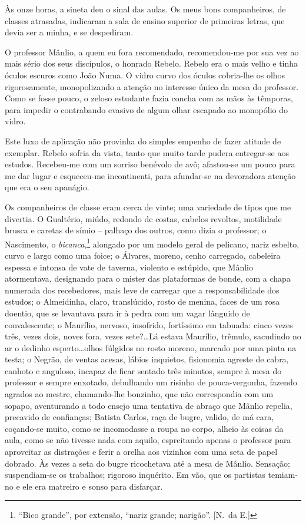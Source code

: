 Às onze horas, a sineta deu o sinal das aulas. Os meus
bons companheiros, de classes atrasadas, indicaram a sala de ensino superior de 
primeiras letras, que devia ser a
minha, e se despediram. 

O professor Mânlio, a quem eu fora recomendado,
recomendou{}-me por sua vez ao mais sério dos seus discípulos, o
honrado Rebelo. Rebelo era o mais velho e tinha óculos escuros como
João Numa. O vidro curvo dos óculos cobria{}-lhe os olhos
rigorosamente, monopolizando a atenção no interesse único da mesa do
professor. Como se fosse pouco, o zeloso estudante fazia concha com as
mãos às têmporas, para impedir o contrabando evasivo de algum olhar
escapado ao monopólio do vidro. 

Este luxo de aplicação não provinha do
simples empenho de fazer atitude de exemplar. Rebelo sofria da vista,
tanto que muito tarde pudera entregar{}-se aos estudos. Recebeu{}-me
com um sorriso benévolo de avô; afastou{}-se um pouco para me dar lugar
e esqueceu{}-me incontinenti, para afundar{}-se na devoradora atenção
que era o seu apanágio. 

Os companheiros de classe eram cerca de vinte;
uma variedade de tipos que me divertia. O Gualtério, miúdo, redondo de
costas, cabelos revoltos, motilidade brusca e caretas de símio -- palhaço dos outros, 
como dizia o professor; o Nascimento, o \textit{bicanca},\footnote{ ``Bico grande'', 
por extensão, ``nariz grande; narigão''. [N.~da E.]}
alongado por um modelo geral de pelicano, nariz esbelto, curvo e largo
como uma foice; o Álvares, moreno, cenho carregado, cabeleira espessa e
intonsa de vate de taverna, violento e estúpido, que Mânlio
atormentava, designando para o mister das plataformas de bonde, com a
chapa numerada dos recebedores, mais leve de carregar que a
responsabilidade dos estudos; o Almeidinha, claro, translúcido, rosto
de menina, faces de um rosa doentio, que se levantava para ir à pedra
com um vagar lânguido de convalescente; o Maurílio, nervoso, insofrido,
fortíssimo em tabuada: cinco vezes três, vezes dois, noves fora, vezes
sete?\ldots Lá estava Maurílio, trêmulo, sacudindo no ar o dedinho
esperto\ldots olhos fúlgidos no rosto moreno, marcado por uma pinta na
testa; o Negrão, de ventas acesas, lábios inquietos, fisionomia agreste
de cabra, canhoto e anguloso, incapaz de ficar sentado três minutos,
sempre à mesa do professor e sempre enxotado, debulhando um risinho de
pouca{}-vergonha, fazendo agrados ao mestre, chamando{}-lhe bonzinho, que
não correspondia com um sopapo, aventurando a todo ensejo uma tentativa
de abraço que Mânlio repelia, precavido de confianças; Batista Carlos,
raça de bugre, valido, de má cara, coçando{}-se muito, como se
incomodasse a roupa no corpo, alheio às coisas da aula, como se não
tivesse nada com aquilo, espreitando apenas o professor para aproveitar
as distrações e ferir a orelha aos vizinhos com uma seta de papel
dobrado. Às vezes a seta do bugre ricochetava até a mesa de Mânlio.
Sensação; suspendiam{}-se os trabalhos; rigoroso inquérito. Em vão, que
os partistas temiam{}-no e ele era matreiro e sonso para disfarçar.

